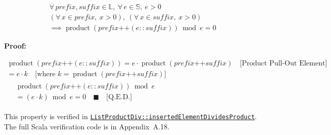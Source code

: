 \begin{gather*}
\forall\, prefix, suffix \in \mathbb{L},\ \forall\, e \in \mathbb{S},\ e > 0 \\
(\forall\, x \in prefix,\ x > 0),\ (\forall\, x \in suffix,\ x > 0) \\
\implies \operatorname{product}(prefix \mathbin{\texttt{++}} (e :: suffix)) \bmod e = 0
\end{gather*}

\textbf{Proof:}

\begin{gather*}
\operatorname{product}(prefix \mathbin{\texttt{++}} (e :: suffix)) = e \cdot \operatorname{product}(prefix \mathbin{\texttt{++}} suffix)
\quad \text{[Product Pull-Out Element]} \\
= e \cdot k
\quad \text{[where $k = \operatorname{product}(prefix \mathbin{\texttt{++}} suffix)$]} \\
\begin{aligned}
&\operatorname{product}(prefix \mathbin{\texttt{++}} (e :: suffix)) \bmod e \\
&= (e \cdot k) \bmod e = 0 \quad \blacksquare \quad \text{[Q.E.D.]}
\end{aligned}
\end{gather*}

{\raggedright
This property is verified in
\href{https://github.com/thiagomata/prime-numbers/blob/list-article-v1.0.0/src/main/scala/v1/chapter3/list/properties/ListProductDiv.scala}{\texttt{ListProductDiv::\allowbreak insertedElementDividesProduct}}.
The full Scala verification code is in Appendix~A.18.
\par}
